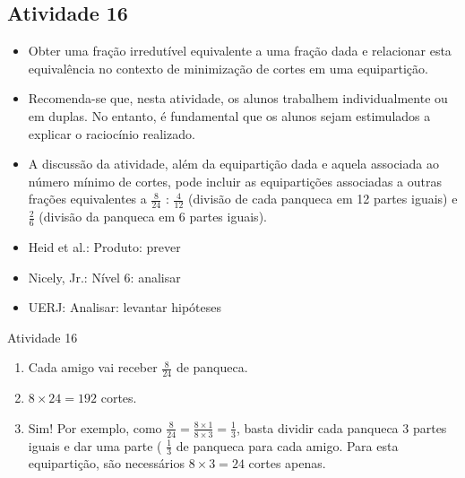 \subsection{Atividade 16}

\begin{itemize} %
    \item       Obter uma fração irredutível equivalente a uma fração dada e
relacionar esta equivalência no contexto de minimização de cortes em uma
equipartição.
\end{itemize} %


\begin{itemize} %
    \item       Recomenda-se que, nesta atividade, os alunos trabalhem
individualmente ou em duplas. No entanto, é fundamental que os alunos sejam
estimulados a explicar o raciocínio realizado.
    \item       A discussão da atividade, além da equipartição dada e aquela
associada ao número mínimo de cortes, pode incluir as equipartições associadas a
outras frações equivalentes a       $\frac{8}{24}$      :       $\frac{4}{12}$
    (divisão de cada panqueca em 12 partes iguais) e       $\frac{2}{6}$
(divisão da panqueca em 6 partes iguais).
\end{itemize} %


   \vspace{.1cm}

 \vspace{.1cm}

\begin{itemize} %
    \item       Heid et al.: Produto: prever
    \item       Nicely, Jr.: Nível 6: analisar
    \item       UERJ: Analisar: levantar hipóteses
\end{itemize} %


\begin{resposta*}{Atividade 16}
\begin{enumerate} [\quad a)] %
    \item       Cada amigo vai receber       $\frac{8}{24}$       de panqueca.
    \item             $8 \times 24 = 192$       cortes.
    \item       Sim! Por exemplo, como       $\frac{8}{24} = \frac{8 \times 1}{8
\times 3} = \frac{1}{3}$, basta dividir cada panqueca       $3$       partes
iguais e dar uma parte (      $\frac{1}{3}$       de panqueca para cada amigo.
Para esta equipartição, são necessários       $8 \times 3 = 24$       cortes
apenas.
\end{enumerate} %

\end{resposta*}

